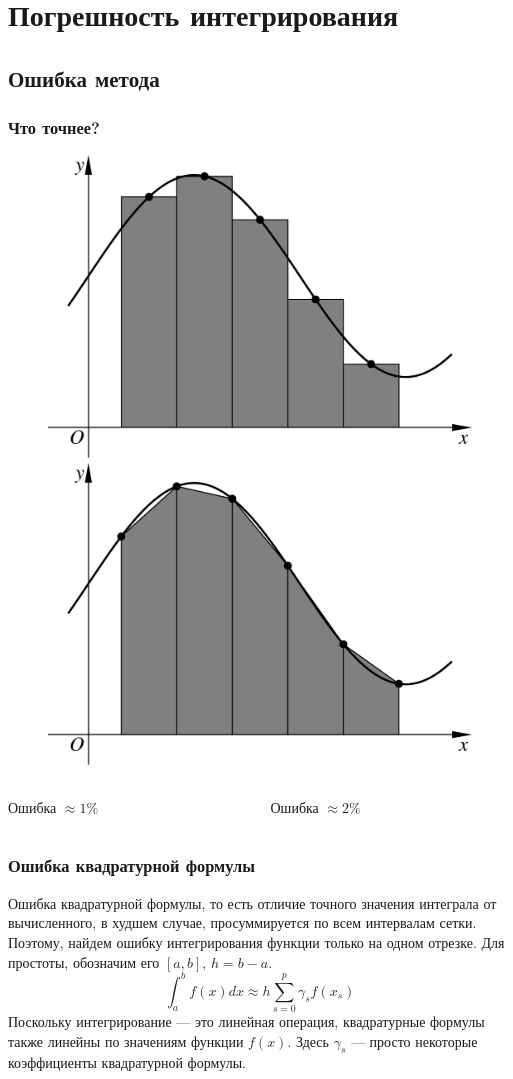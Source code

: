 \documentclass[apectratio=43,unicode]{beamer}
\begin{document}
\section{Погрешность интегрирования}
\subsection{Ошибка метода}
\begin{frame}
\frametitle{Что точнее?}
	\begin{figure}%
	\includegraphics[width=0.5\columnwidth]{rect.pdf}%
	\includegraphics[width=0.5\columnwidth]{trap.pdf}%
	\end{figure}
	\pause

	\begin{columns}[c]
	\begin{column}{0.5\textwidth}
	\centering
	Ошибка $\approx 1\%$
	\end{column}
	\begin{column}{0.5\textwidth}
	\centering
	Ошибка $\approx 2\%$
	\end{column}
	\end{columns}
\end{frame}

\begin{frame}
\frametitle{Ошибка квадратурной формулы}
	Ошибка квадратурной формулы, то есть отличие точного значения интеграла от вычисленного, в худшем случае,
	просуммируется по всем интервалам сетки. Поэтому, найдем ошибку интегрирования функции только на одном отрезке.
	Для простоты, обозначим его $[a,b], \, h = b-a$.
	\[
	\int_a^b f(x) dx \approx h \sum_{s=0}^p \gamma_s f(x_s)
	\]
	\pause
	Поскольку интегрирование --- это линейная операция,
	квадратурные формулы также линейны по значениям функции $f(x)$. Здесь $\gamma_s$ --- просто некоторые
	коэффициенты квадратурной формулы.
\end{frame}
\end{document}

